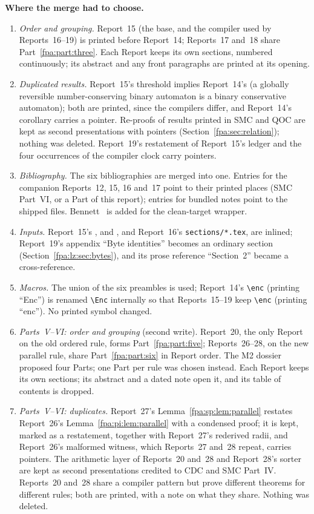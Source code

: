 \documentclass[11pt,a4paper]{article}
\numberwithin{equation}{section}
\newcommand{\enc}{\operatorname{enc}}\newcommand{\Enc}{\operatorname{Enc}}
\begin{document}
\textbf{Where the merge had to choose.}
\begin{enumerate}
\item \emph{Order and grouping.} Report~15 (the base, and the compiler used by Reports~16--19) is printed before Report~14; Reports~17 and~18 share Part~\ref{fpa:part:three}. Each Report keeps its own sections, numbered continuously; its abstract and any front paragraphs are printed at its opening.
\item \emph{Duplicated results.} Report~15's threshold implies Report~14's (a globally reversible number-conserving binary automaton is a binary conservative automaton); both are printed, since the compilers differ, and Report~14's corollary carries a pointer. Re-proofs of results printed in SMC and QOC are kept as second presentations with pointers (Section~\ref{fpa:sec:relation}); nothing was deleted. Report~19's restatement of Report~15's ledger and the four occurrences of the compiler clock carry pointers.
\item \emph{Bibliography.} The six bibliographies are merged into one. Entries for the companion Reports~12, 15, 16 and~17 point to their printed places (SMC Part~VI, or a Part of this report); entries for bundled notes point to the shipped files. Bennett~\cite{fpa:bennett} is added for the clean-target wrapper.
\item \emph{Inputs.} Report~15's ,  and , and Report~16's \texttt{sections/*.tex}, are inlined; Report~19's appendix ``Byte identities'' becomes an ordinary section (Section~\ref{fpa:lz:sec:bytes}), and its prose reference ``Section~2'' became a cross-reference.
\item \emph{Macros.} The union of the six preambles is used; Report~14's \verb|\enc| (printing ``Enc'') is renamed \verb|\Enc| internally so that Reports~15--19 keep \verb|\enc| (printing ``enc''). No printed symbol changed.
\item \emph{Parts~V--VI: order and grouping} (second write). Report~20, the only Report on the old ordered rule, forms Part~\ref{fpa:part:five}; Reports~26--28, on the new parallel rule, share Part~\ref{fpa:part:six} in Report order. The M2 dossier proposed four Parts; one Part per rule was chosen instead. Each Report keeps its own sections; its abstract and a dated note open it, and its table of contents is dropped.
\item \emph{Parts~V--VI: duplicates.} Report~27's Lemma~\ref{fpa:sp:lem:parallel} restates Report~26's Lemma~\ref{fpa:pi:lem:parallel} with a condensed proof; it is kept, marked as a restatement, together with Report~27's rederived radii, and Report~26's malformed witness, which Reports~27 and~28 repeat, carries pointers. The arithmetic layer of Reports~20 and~28 and Report~28's sorter are kept as second presentations credited to CDC and SMC Part~IV. Reports~20 and~28 share a compiler pattern but prove different theorems for different rules; both are printed, with a note on what they share. Nothing was deleted.

\end{enumerate}
\end{document}
